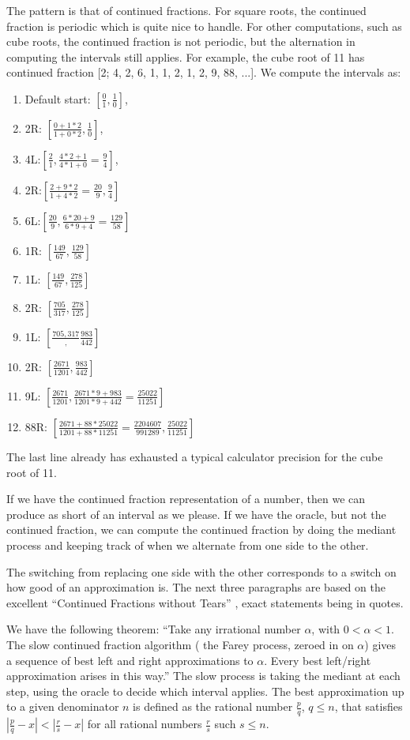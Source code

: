 \documentclass[12pt]{article}
\theoremstyle{remark}
\begin{document}
The pattern is that of continued fractions. For square roots, the continued fraction is periodic which is quite nice to handle. For other computations, such as cube roots, the continued fraction is not periodic, but the alternation in computing the intervals still applies. For example, the cube root of 11 has continued fraction [2; 4, 2, 6, 1, 1, 2, 1, 2, 9, 88, ...]. We compute the intervals as:  
\begin{enumerate}
\item Default start: $[\frac{0}{1}, \frac{1}{0}]$, 
\item 2R: $[\frac{0+1*2}{1+0*2}, \frac{1}{0}]$, 
\item 4L:$[\frac{2}{1}, \frac{4*2+1}{4*1+0} =\frac{9}{4}]$, 
\item 2R:$[\frac{2+9*2}{1+4*2} = \frac{20}{9}, \frac{9}{4}]$
\item 6L:$[\frac{20}{9}, \frac{6*20+9}{6*9 + 4} = \frac{129}{58}]$
\item 1R: $[\frac{149}{67}, \frac{129}{58}]$
\item 1L: $[\frac{149}{67}, \frac{278}{125}]$
\item 2R: $[\frac{705}{317}, \frac{278}{125}]$
\item 1L: $[\frac{705, 317}, \frac{983}{442}]$
\item 2R: $[\frac{2671}{1201}, \frac{983}{442}]$
\item 9L: $[\frac{2671}{1201}, \frac{2671*9+983}{1201*9+442} = \frac{25022}{11251}]$
\item 88R: $[\frac{2671+88*25022}{1201+88*11251} = \frac{2204607}{991289}, \frac{25022}{11251}]$
\end{enumerate}

The last line already has exhausted a typical calculator precision for the cube root of 11. 

If we have the continued fraction representation of a number, then we can produce as short of an interval as we please. If we have the oracle, but not the continued fraction, we can compute the continued fraction by doing the mediant process and keeping track of when we alternate from one side to the other. 

The switching from replacing one side with the other corresponds to a switch on how good of an approximation is. The next three paragraphs are based on the excellent ``Continued Fractions without Tears'' \cite{richards}, exact statements being in quotes.  

We have the following theorem: ``Take any irrational number $\alpha$, with $0 < \alpha < 1$. The slow continued fraction algorithm ( the Farey process, zeroed in on $\alpha$) gives a sequence of best left and right approximations to $\alpha$. Every best left/right approximation arises in this way.'' The slow process is taking the mediant at each step, using the oracle to decide which interval applies. The best approximation up to a given denominator $n$ is defined as the rational number $\frac{p}{q}$, $q  \leq n$, that satisfies $|\frac{p}{q} - x | < |\frac{r}{s} -x|$ for all rational numbers $\frac{r}{s}$ such $s \leq n$.
\end{document}
